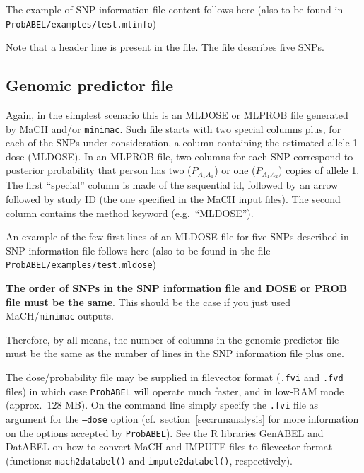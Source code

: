 \documentclass[12pt,a4paper]{article}
\begin{document}
The example of SNP information file content follows here (also
to be found in \texttt{ProbABEL/examples/test.mlinfo})



Note that a header line is present in the file. The file describes
five SNPs.

\subsection{Genomic predictor file}
\label{ssec:dosein}

Again, in the simplest scenario this is an MLDOSE or MLPROB file
generated by MaCH and/or \texttt{minimac}.  Such file starts with two
special columns plus, for each of the SNPs under consideration, a
column containing the estimated allele 1 dose (MLDOSE).  In an MLPROB
file, two columns for each SNP correspond to posterior probability
that person has two ($P_{A_1A_1}$) or one ($P_{A_1A_2}$) copies of
allele 1.  The first ``special'' column is made of the sequential id,
followed by an arrow followed by study ID (the one specified in the
MaCH input files). The second column contains the method keyword
(e.g.~``MLDOSE'').

An example of the few first lines of an MLDOSE file for
five SNPs described in SNP information file follows here (also
to be found in the file \texttt{ProbABEL/examples/test.mldose})




\textbf{The order of SNPs in the SNP information file and DOSE or PROB
  file must be the same}. This should be the case if you just used
MaCH/\texttt{minimac} outputs.

Therefore, by all means, the number of columns in the genomic predictor file
must be the same as the number of lines in the SNP information file plus one.

The dose/probability file may be supplied in filevector format
(\texttt{.fvi} and \texttt{.fvd} files) in which case
\texttt{ProbABEL} will operate much faster, and in low-RAM mode
(approx.~128 MB). On the command line simply specify the \texttt{.fvi}
file as argument for the \texttt{--dose} option
(cf.~section~\ref{sec:runanalysis} for more information on the options
accepted by \texttt{ProbABEL}). See the R libraries GenABEL and
DatABEL on how to convert MaCH and IMPUTE files to
filevector format (functions: \texttt{mach2databel()} and
\texttt{impute2databel()}, respectively).
\end{document}

